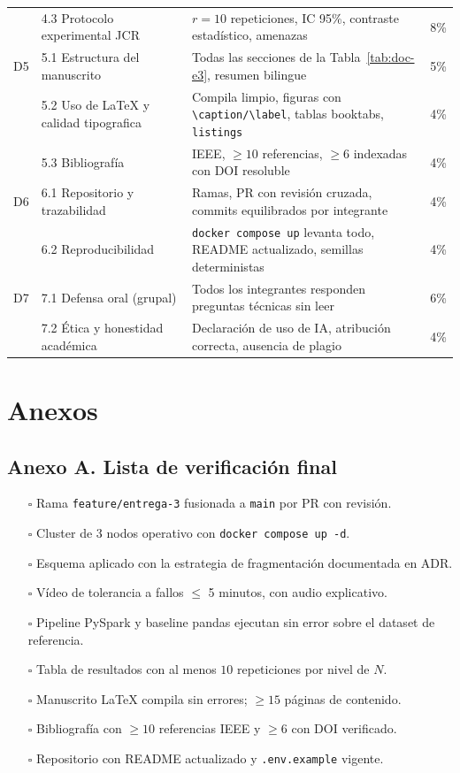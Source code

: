 \documentclass[11pt,a4paper]{article}
\begin{document}
\begin{xltabular}{\linewidth}{@{}p{0.9cm} p{4.6cm} X p{1cm}@{}}
           & 4.3 Protocolo experimental JCR & $r=10$ repeticiones, IC 95\%, contraste estadístico, amenazas & 8\%\\
        D5 & 5.1 Estructura del manuscrito & Todas las secciones de la Tabla~\ref{tab:doc-e3}, resumen bilingue & 5\%\\
           & 5.2 Uso de LaTeX y calidad tipografica & Compila limpio, figuras con \texttt{\textbackslash caption/\textbackslash label}, tablas booktabs, \texttt{listings} & 4\%\\
           & 5.3 Bibliografía & IEEE, $\ge 10$ referencias, $\ge 6$ indexadas con DOI resoluble & 4\%\\
        D6 & 6.1 Repositorio y trazabilidad & Ramas, PR con revisión cruzada, commits equilibrados por integrante & 4\%\\
           & 6.2 Reproducibilidad & \texttt{docker compose up} levanta todo, README actualizado, semillas deterministas & 4\%\\
        D7 & 7.1 Defensa oral (grupal) & Todos los integrantes responden preguntas técnicas sin leer & 6\%\\
           & 7.2 Ética y honestidad académica & Declaración de uso de IA, atribución correcta, ausencia de plagio & 4\%\\
    \end{xltabular}
    \normalsize

\section{Anexos}

\subsection*{Anexo A. Lista de verificación final}

    \begin{itemize}
        \item[$\square$] Rama \texttt{feature/entrega-3} fusionada a \texttt{main} por PR con revisión.
        \item[$\square$] Cluster de 3 nodos operativo con \texttt{docker compose up -d}.
        \item[$\square$] Esquema aplicado con la estrategia de fragmentación documentada en ADR.
        \item[$\square$] Vídeo de tolerancia a fallos $\le$ 5 minutos, con audio explicativo.
        \item[$\square$] Pipeline PySpark y baseline pandas ejecutan sin error sobre el dataset de referencia.
        \item[$\square$] Tabla de resultados con al menos $10$ repeticiones por nivel de $N$.
        \item[$\square$] Manuscrito LaTeX compila sin errores; $\ge 15$ páginas de contenido.
        \item[$\square$] Bibliografía con $\ge 10$ referencias IEEE y $\ge 6$ con DOI verificado.
        \item[$\square$] Repositorio con README actualizado y \texttt{.env.example} vigente.
    \end{itemize}
\end{document}
